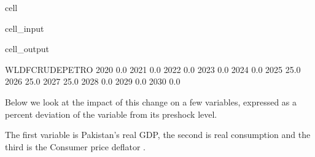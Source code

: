 \documentclass[letterpaper,10pt,english]{jupyterBook}
\begin{document}
\begin{sphinxuseclass}{cell}\begin{sphinxVerbatimInput}

\begin{sphinxuseclass}{cell_input}
\begin{sphinxVerbatim}[commandchars=\\\{\}]
 
    \PYG{p}{[}\PYG{p}{]}
\end{sphinxVerbatim}

\end{sphinxuseclass}\end{sphinxVerbatimInput}
\begin{sphinxVerbatimOutput}

\begin{sphinxuseclass}{cell_output}
\begin{sphinxVerbatim}[commandchars=\\\{\}]
      WLDFCRUDE\PYGZus{}PETRO
2020              0.0
2021              0.0
2022              0.0
2023              0.0
2024              0.0
2025             25.0
2026             25.0
2027             25.0
2028              0.0
2029              0.0
2030              0.0
\end{sphinxVerbatim}

\end{sphinxuseclass}\end{sphinxVerbatimOutput}

\end{sphinxuseclass}
\sphinxAtStartPar
Below we look at the impact of this change on a few variables, expressed as a percent deviation of the variable from its pre\sphinxhyphen{}shock level.

\sphinxAtStartPar
The first variable  is Pakistan’s real GDP, the second  is real consumption and the third is the Consumer price deflator .
\end{document}
